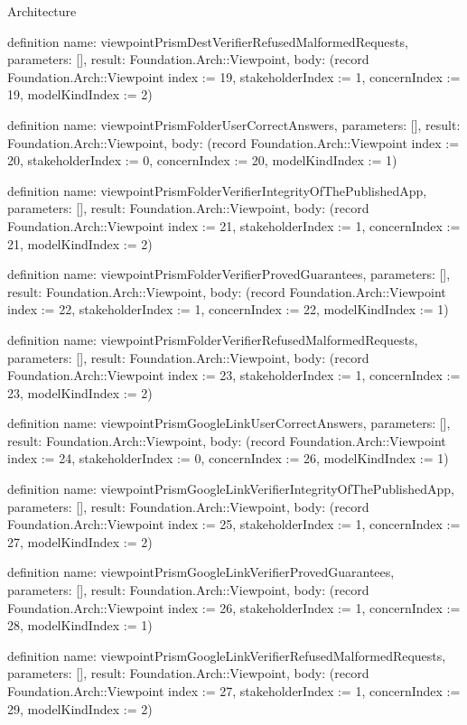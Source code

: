 \begin{lexlean}{Architecture}
\begin{semanticmodule}
definition{
  name: viewpointPrismDestVerifierRefusedMalformedRequests,
  parameters: [],
  result: Foundation.Arch::Viewpoint,
  body: (record Foundation.Arch::Viewpoint {index := 19, stakeholderIndex := 1, concernIndex := 19, modelKindIndex := 2})
}

definition{
  name: viewpointPrismFolderUserCorrectAnswers,
  parameters: [],
  result: Foundation.Arch::Viewpoint,
  body: (record Foundation.Arch::Viewpoint {index := 20, stakeholderIndex := 0, concernIndex := 20, modelKindIndex := 1})
}

definition{
  name: viewpointPrismFolderVerifierIntegrityOfThePublishedApp,
  parameters: [],
  result: Foundation.Arch::Viewpoint,
  body: (record Foundation.Arch::Viewpoint {index := 21, stakeholderIndex := 1, concernIndex := 21, modelKindIndex := 2})
}

definition{
  name: viewpointPrismFolderVerifierProvedGuarantees,
  parameters: [],
  result: Foundation.Arch::Viewpoint,
  body: (record Foundation.Arch::Viewpoint {index := 22, stakeholderIndex := 1, concernIndex := 22, modelKindIndex := 1})
}

definition{
  name: viewpointPrismFolderVerifierRefusedMalformedRequests,
  parameters: [],
  result: Foundation.Arch::Viewpoint,
  body: (record Foundation.Arch::Viewpoint {index := 23, stakeholderIndex := 1, concernIndex := 23, modelKindIndex := 2})
}

definition{
  name: viewpointPrismGoogleLinkUserCorrectAnswers,
  parameters: [],
  result: Foundation.Arch::Viewpoint,
  body: (record Foundation.Arch::Viewpoint {index := 24, stakeholderIndex := 0, concernIndex := 26, modelKindIndex := 1})
}

definition{
  name: viewpointPrismGoogleLinkVerifierIntegrityOfThePublishedApp,
  parameters: [],
  result: Foundation.Arch::Viewpoint,
  body: (record Foundation.Arch::Viewpoint {index := 25, stakeholderIndex := 1, concernIndex := 27, modelKindIndex := 2})
}

definition{
  name: viewpointPrismGoogleLinkVerifierProvedGuarantees,
  parameters: [],
  result: Foundation.Arch::Viewpoint,
  body: (record Foundation.Arch::Viewpoint {index := 26, stakeholderIndex := 1, concernIndex := 28, modelKindIndex := 1})
}

definition{
  name: viewpointPrismGoogleLinkVerifierRefusedMalformedRequests,
  parameters: [],
  result: Foundation.Arch::Viewpoint,
  body: (record Foundation.Arch::Viewpoint {index := 27, stakeholderIndex := 1, concernIndex := 29, modelKindIndex := 2})
}


\end{semanticmodule}
\end{lexlean}
